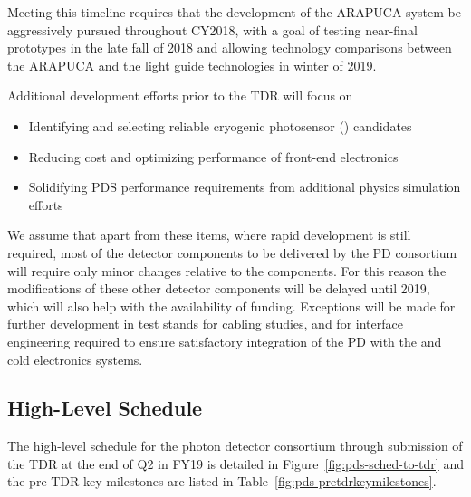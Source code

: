 Meeting this timeline requires that the development of the ARAPUCA system be aggressively pursued throughout CY2018, with a goal of testing near-final prototypes in the late fall of \num{2018} and allowing technology comparisons between the ARAPUCA and the light guide technologies in winter of \num{2019}.

Additional development efforts prior to the TDR will focus on

\begin{itemize}
\item Identifying and selecting reliable cryogenic photosensor () candidates
\item Reducing cost and optimizing performance of front-end electronics
\item Solidifying PDS performance requirements from additional physics simulation efforts
\end{itemize}

We assume that apart from these items, where rapid development is still required, most of the detector components to be delivered by the PD consortium will require only minor changes relative to the  components. For this reason the modifications of these other detector components will be delayed until \num{2019}, which will also help with the availability of funding. Exceptions will be made for further development in test stands for cabling studies, and for interface engineering required to ensure satisfactory integration of the PD with the  and cold electronics systems.


\subsection{High-Level Schedule}
\label{sec:fdsp-pd-org-cs}

The high-level schedule for the photon detector consortium through submission of the TDR at the end of Q2 in FY19 is detailed in Figure~\ref{fig:pds-sched-to-tdr} and the pre-TDR key milestones are listed in Table~\ref{fig:pds-pretdrkeymilestones}.

